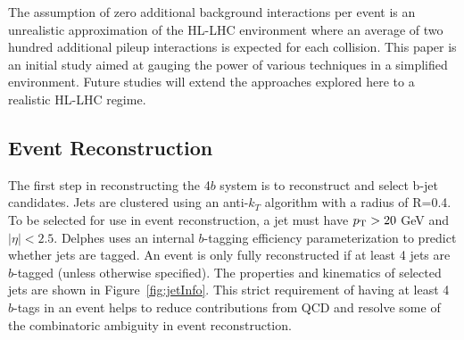 The assumption of zero additional background interactions per event is an unrealistic approximation of the HL-LHC environment where an average of two hundred additional pileup interactions is expected for each collision. This paper is an initial study aimed at gauging the power of various techniques in a simplified environment. Future studies will extend the approaches explored here to a realistic HL-LHC regime.

\subsection{Event Reconstruction}
\label{sec:eventReco}
The first step in reconstructing the 4$b$ system is to reconstruct and select b-jet candidates. Jets are clustered using an anti-$k_T$ algorithm with a radius of R=0.4. To be selected for use in event reconstruction, a jet must have $p_{\text{T}} > 20$ GeV and $\mid\eta\mid < 2.5$. Delphes uses an internal $b$-tagging efficiency parameterization to predict whether jets are tagged. An event is only fully reconstructed if at least 4 jets are $b$-tagged (unless otherwise specified). The properties and kinematics of selected jets are shown in Figure~\ref{fig:jetInfo}. This strict requirement of having at least 4 $b$-tags in an event helps to reduce contributions from QCD and resolve some of the combinatoric ambiguity in event reconstruction.

